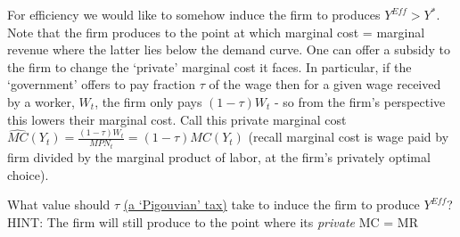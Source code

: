 \documentclass[authoryear,11pt]{elsarticle}
\begin{document}
For efficiency we would like to somehow induce the firm to produces $Y^{Eff}>Y^{\ast}$. Note that the firm produces to the point at which marginal cost = marginal revenue where the latter lies below the demand curve. One can offer a subsidy to the firm to change the `private' marginal cost it faces. In particular, if the `government' offers to pay fraction $\tau$ of the wage then for a given wage received by a worker, $W_{t}$, the firm only pays $(1-\tau)W_{t}$ - so from the firm's perspective this lowers their marginal cost. Call this private marginal cost $\widehat{MC}(Y_{t}) = \frac{(1-\tau)W_{t}}{MPN_{t}} = (1-\tau)MC(Y_{t})$ (recall marginal cost is wage paid by firm divided by the marginal product of labor, at the firm's privately optimal choice).

What value should $\tau$ \href{https://en.wikipedia.org/wiki/Pigovian_tax}{(a `Pigouvian' tax)} take to induce the firm to produce $Y^{Eff}$? HINT: The firm will still produce to the point where its \emph{private} MC = MR

%
%
\end{document}
